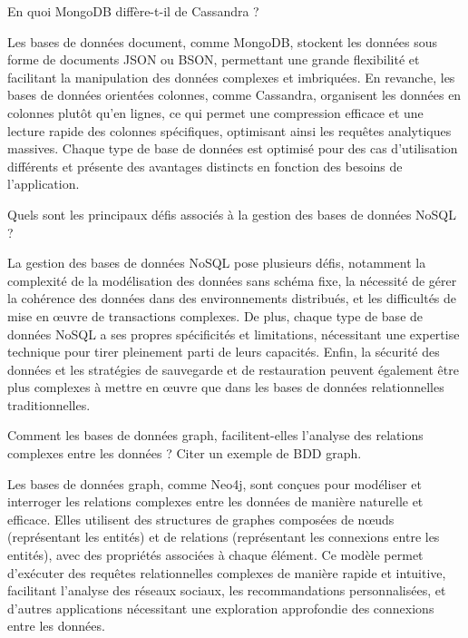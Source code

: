 \documentclass[12pt,a4paper,addpoints,answers]{exam}
\begin{document}
\begin{questions}
		\question[5] En quoi MongoDB diffère-t-il de Cassandra ?
		
		\fillwithlines{15cm}
		
		\begin{solution}
			Les bases de données document, comme MongoDB, stockent les données sous forme de documents JSON ou BSON, permettant une grande flexibilité et facilitant la manipulation des données complexes et imbriquées. En revanche, les bases de données orientées colonnes, comme Cassandra, organisent les données en colonnes plutôt qu'en lignes, ce qui permet une compression efficace et une lecture rapide des colonnes spécifiques, optimisant ainsi les requêtes analytiques massives. Chaque type de base de données est optimisé pour des cas d'utilisation différents et présente des avantages distincts en fonction des besoins de l'application.
		\end{solution}
		
		\question[5] Quels sont les principaux défis associés à la gestion des bases de données NoSQL ?
		
		\fillwithlines{15cm}
		
		\begin{solution}
			La gestion des bases de données NoSQL pose plusieurs défis, notamment la complexité de la modélisation des données sans schéma fixe, la nécessité de gérer la cohérence des données dans des environnements distribués, et les difficultés de mise en œuvre de transactions complexes. De plus, chaque type de base de données NoSQL a ses propres spécificités et limitations, nécessitant une expertise technique pour tirer pleinement parti de leurs capacités. Enfin, la sécurité des données et les stratégies de sauvegarde et de restauration peuvent également être plus complexes à mettre en œuvre que dans les bases de données relationnelles traditionnelles.
		\end{solution}
		
		\question[5] Comment les bases de données graph, facilitent-elles l'analyse des relations complexes entre les données ? Citer un exemple de BDD graph.
		
		\fillwithlines{15cm}
		
		\begin{solution}
			Les bases de données graph, comme Neo4j, sont conçues pour modéliser et interroger les relations complexes entre les données de manière naturelle et efficace. Elles utilisent des structures de graphes composées de nœuds (représentant les entités) et de relations (représentant les connexions entre les entités), avec des propriétés associées à chaque élément. Ce modèle permet d'exécuter des requêtes relationnelles complexes de manière rapide et intuitive, facilitant l'analyse des réseaux sociaux, les recommandations personnalisées, et d'autres applications nécessitant une exploration approfondie des connexions entre les données.
		\end{solution}
		

\end{questions}
\end{document}
